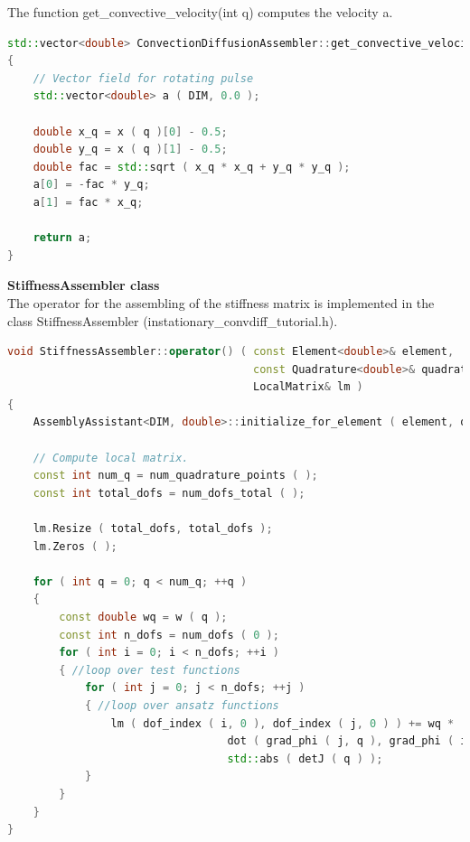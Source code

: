 \documentclass[a4paper, 11pt, twoside]{article}
\begin{document}
The function get\_convective\_velocity(int q) computes the velocity a.
\begin{lstlisting}[language=C++, basicstyle={\footnotesize, \ttfamily}, keywordstyle=\color{blue}, numbers=none, tabsize=4]
std::vector<double> ConvectionDiffusionAssembler::get_convective_velocity ( int q )
{
    // Vector field for rotating pulse
    std::vector<double> a ( DIM, 0.0 );

    double x_q = x ( q )[0] - 0.5;
    double y_q = x ( q )[1] - 0.5;
    double fac = std::sqrt ( x_q * x_q + y_q * y_q );
    a[0] = -fac * y_q;
    a[1] = fac * x_q;

    return a;
}
\end{lstlisting}

\textbf{StiffnessAssembler class}\\
The operator for the assembling of the stiffness matrix is implemented in the class StiffnessAssembler (instationary\_convdiff\_tutorial.h).
\begin{lstlisting}[language=C++, basicstyle={\footnotesize, \ttfamily}, keywordstyle=\color{blue}, numbers=none, tabsize=4]
void StiffnessAssembler::operator() ( const Element<double>& element, 
                                      const Quadrature<double>& quadrature, 
                                      LocalMatrix& lm )
{
    AssemblyAssistant<DIM, double>::initialize_for_element ( element, quadrature );

    // Compute local matrix.
    const int num_q = num_quadrature_points ( );
    const int total_dofs = num_dofs_total ( );

    lm.Resize ( total_dofs, total_dofs );
    lm.Zeros ( );

    for ( int q = 0; q < num_q; ++q )
    {
        const double wq = w ( q );
        const int n_dofs = num_dofs ( 0 );
        for ( int i = 0; i < n_dofs; ++i )
        { //loop over test functions
            for ( int j = 0; j < n_dofs; ++j )
            { //loop over ansatz functions
                lm ( dof_index ( i, 0 ), dof_index ( j, 0 ) ) += wq * 
                                  dot ( grad_phi ( j, q ), grad_phi ( i, q ) ) * 
                                  std::abs ( detJ ( q ) );
            }
        }
    }
}
\end{lstlisting}
\end{document}

